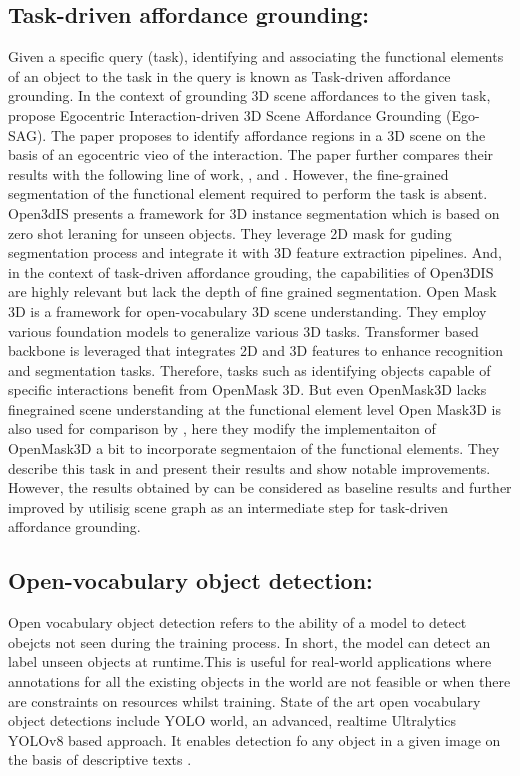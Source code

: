  \subsection{Task-driven affordance grounding:}
Given a specific query (task), identifying and associating the functional elements of an object to the task in the query is known as Task-driven affordance grounding. 
In the context of grounding 3D scene affordances to the given task, \citet{liu2024grounding3dsceneaffordance} propose
 Egocentric Interaction-driven 3D Scene Affordance Grounding (Ego-SAG). The paper proposes to identify affordance regions in a 3D scene on the basis of 
 an egocentric vieo of the interaction. The paper further compares their results with the following line of work,
\cite{huang2024openins3dsnaplookup3d}, \cite{Nguyen_2024_CVPR} and \cite{takmaz2023openmask3dopenvocabulary3dinstance}. However, the fine-grained 
segmentation of the functional element required to perform the task is absent. Open3dIS presents a framework for 3D instance segmentation which is based on
zero shot leraning for unseen objects. They leverage 2D mask for guding segmentation process and integrate it with 3D feature extraction pipelines. And, in the context
of task-driven affordance grouding, the capabilities of Open3DIS are highly relevant but lack the depth of fine grained segmentation. Open Mask 3D is a framework
 for open-vocabulary 3D scene understanding. They employ
various foundation models to generalize various 3D tasks. Transformer based backbone is leveraged that integrates 2D and 3D features to enhance 
recognition and segmentation tasks. Therefore, tasks such as identifying objects capable of specific interactions benefit from OpenMask 3D. 
But even OpenMask3D lacks finegrained scene understanding at the functional element level
Open Mask3D \cite{takmaz2023openmask3dopenvocabulary3dinstance} is also used for comparison by
\citet{delitzas2024scenefun3d}, here they modify the implementaiton of OpenMask3D a bit to incorporate segmentaion of the functional elements. 
They describe this task in \cite{delitzas2024scenefun3d} and present their results and show notable improvements.\\
However, the results obtained by \citet{delitzas2024scenefun3d}
can be considered as baseline results and further improved by utilisig scene graph as an intermediate step for task-driven affordance grounding.

 \subsection{Open-vocabulary object detection:}
Open vocabulary object detection refers to the ability of a model to detect obejcts not seen during the training process. 
In short, the model can detect an label unseen objects at runtime.This is useful for real-world applications where annotations for all the 
existing objects in the world are not feasible or when there are constraints on resources whilst training. State of the art open vocabulary object detections include
YOLO world, an advanced, realtime Ultralytics YOLOv8 based approach. It enables detection fo any object in a given image on the basis of descriptive texts \cite{cheng2024yolow}. \\

